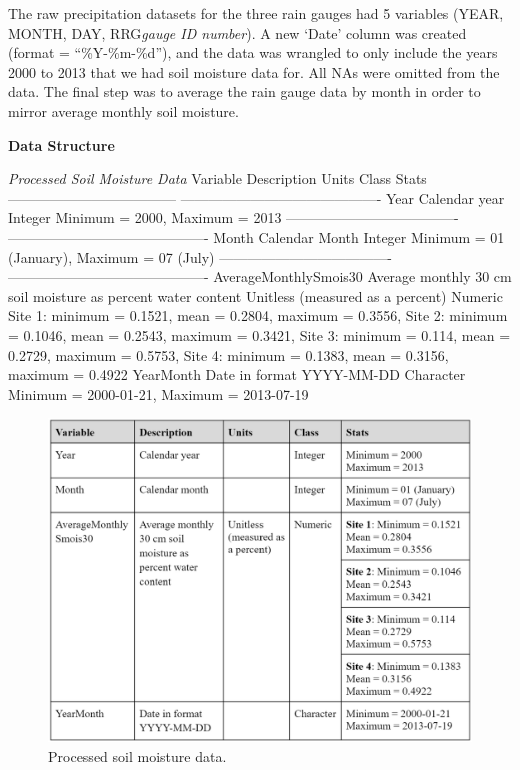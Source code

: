 \documentclass[
  12pt,
]{article}
\begin{document}
The raw precipitation datasets for the three rain gauges had 5 variables
(YEAR, MONTH, DAY, RRG\emph{gauge ID number}). A new `Date' column was
created (format = ``\%Y-\%m-\%d''), and the data was wrangled to only
include the years 2000 to 2013 that we had soil moisture data for. All
NAs were omitted from the data. The final step was to average the rain
gauge data by month in order to mirror average monthly soil moisture.

\textbf{Data Structure}

\emph{Processed Soil Moisture Data} \textbar Variable \textbar{}
Description \textbar{} Units \textbar{} Class \textbar{} Stats
\textbar{} \textbar---------------\textbar---------------\textbar------
\textbar------------\textbar-------------------------------\textbar{}
\textbar Year \textbar{} Calendar year \textbar{} \textbar Integer
\textbar{} Minimum = 2000, Maximum = 2013\textbar{}
\textbar---------------\textbar---------------\textbar-------\textbar------------\textbar-------------------------------\textbar{}
\textbar Month \textbar Calendar Month \textbar{} \textbar Integer
\textbar Minimum = 01 (January), \textbar{} \textbar{} \textbar{}
\textbar{} \textbar{} \textbar Maximum = 07 (July) \textbar{}
\textbar---------------\textbar---------------\textbar-------\textbar------------\textbar-------------------------------\textbar{}
AverageMonthlySmois30\textbar{} Average monthly 30 cm soil moisture as
percent water content \textbar{} Unitless (measured as a percent)
\textbar{} Numeric \textbar{} Site 1: minimum = 0.1521, mean = 0.2804,
maximum = 0.3556, Site 2: minimum = 0.1046, mean = 0.2543, maximum =
0.3421, Site 3: minimum = 0.114, mean = 0.2729, maximum = 0.5753, Site
4: minimum = 0.1383, mean = 0.3156, maximum = 0.4922 \textbar{}
\textbar YearMonth\textbar{} Date in format YYYY-MM-DD \textbar{}
\textbar{} Character \textbar{} Minimum = 2000-01-21, Maximum =
2013-07-19\textbar{}

\begin{figure}
\centering
\includegraphics{../Data/SoilMoistureTable.png}
\caption{Processed soil moisture data.}
\end{figure}
\end{document}
